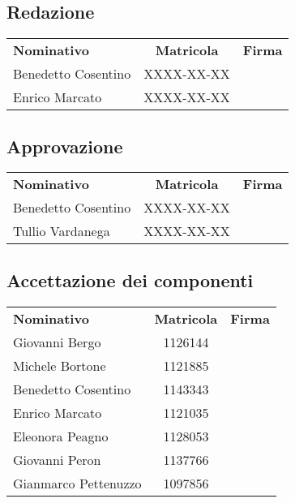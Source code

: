 \subsection{Redazione}

{\renewcommand{\arraystretch}{1.4}%
\begin{table}[h]
	\centering
	\begin{tabular}{| l | c | >{\centering\arraybackslash}m{8cm}
			|} 
		\rowcolor{LightBlue}
		\textbf{\color{white}Nominativo} & 
		\textbf{\color{white}Matricola} & 
		\textbf{\color{white}Firma} \\
	
	Benedetto Cosentino & XXXX-XX-XX & \\
	Enrico Marcato & XXXX-XX-XX & \\ \hline
\end{tabular}
\end{table}
}
\subsection{Approvazione}
{\renewcommand{\arraystretch}{1.4}%
\begin{table}[h]
	\centering
	\begin{tabular}{| l | c | >{\centering\arraybackslash}m{8cm}
			|} 
	\rowcolor{LightBlue}
	\textbf{\color{white}Nominativo} & 
	\textbf{\color{white}Matricola} & 
	\textbf{\color{white}Firma} \\
	
	Benedetto Cosentino & XXXX-XX-XX & \\
	Tullio Vardanega & XXXX-XX-XX & \\ \hline
\end{tabular}
\end{table}
}

\subsection{Accettazione dei componenti}
{\renewcommand{\arraystretch}{1.4}%
\begin{table}[h]
	\centering
\begin{tabular}{| l | c | >{\centering\arraybackslash}m{8cm}
		|} 
	\rowcolor{LightBlue}

	\textbf{\color{white}Nominativo} & 
	\textbf{\color{white}Matricola} & 
	\textbf{\color{white}Firma} \\

	Giovanni Bergo & 1126144 & \\
	Michele Bortone & 1121885 & \\
	Benedetto Cosentino & 1143343 & \\	
	Enrico Marcato & 1121035 & \\
	Eleonora Peagno & 1128053 & \\
	Giovanni Peron & 1137766 & \\
	Gianmarco Pettenuzzo & 1097856 & \\ \hline
\end{tabular}
\end{table}
}
